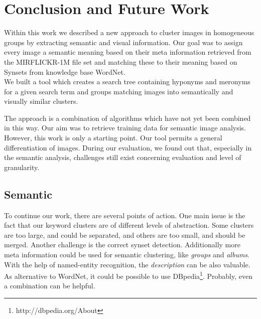 %
\section{Conclusion and Future Work}
\label{sec_future}


Within this work we described a new approach to cluster images in homogeneous groups by extracting semantic and visual information. Our goal was to assign every image a semantic meaning based on their meta information retrieved from the MIRFLICKR-1M file set and matching these to their meaning based on Synsets from knowledge base WordNet.
\\ We built a tool which creates a search tree containing hyponyms and meronyms for a given search term and groups matching images into semantically and visually similar clusters.

\bigskip
The approach is a combination of algorithms which have not yet been combined in this way. Our aim was to retrieve training data for semantic image analysis. However, this work is only a starting point. Our tool permits a general differentiation of images. During our evaluation, we found out that, especially in the semantic analysis, challenges still exist concerning evaluation and level of granularity.

\subsection{Semantic}
To continue our work, there are several points of action. One main issue is the fact that our keyword clusters are of different levels of abstraction. Some clusters are too large, and could be separated, and others are too small, and should be merged. Another challenge is the correct synset detection. Additionally more meta information could be used for semantic clustering, like \emph{groups} and \emph{albums}. With the help of named-entity recognition, the \emph{description} can be also valuable. As alternative to WordNet, it could be possible to use DBpedia\footnote{http://dbpedia.org/About}. Probably, even a combination can be helpful.

